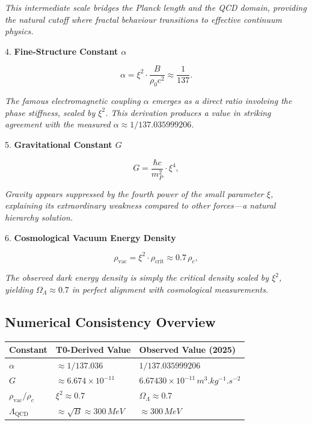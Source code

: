 	\textit{This intermediate scale bridges the Planck length and the QCD domain, providing the natural cutoff where fractal behaviour transitions to effective continuum physics.}
	
	4. \textbf{Fine-Structure Constant \(\alpha\)}
	
	\begin{equation}
		\alpha = \xi^2 \cdot \frac{B}{\rho_0 c^2} \approx \frac{1}{137}.
	\end{equation}
	
	\textit{The famous electromagnetic coupling \(\alpha\) emerges as a direct ratio involving the phase stiffness, scaled by \(\xi^2\). This derivation produces a value in striking agreement with the measured \(\alpha \approx 1/137.035999206\).}
	
	5. \textbf{Gravitational Constant \(G\)}
	
	\begin{equation}
		G = \frac{\hbar c}{m_P^2} \cdot \xi^4,
	\end{equation}
	
	\textit{Gravity appears suppressed by the fourth power of the small parameter \(\xi\), explaining its extraordinary weakness compared to other forces—a natural hierarchy solution.}
	
	6. \textbf{Cosmological Vacuum Energy Density}
	
	\begin{equation}
		\rho_{\text{vac}} = \xi^2 \cdot \rho_{\text{crit}} \approx 0.7\, \rho_c,
	\end{equation}
	
	\textit{The observed dark energy density is simply the critical density scaled by \(\xi^2\), yielding \(\Omega_\Lambda \approx 0.7\) in perfect alignment with cosmological measurements.}
	
	\subsection*{Numerical Consistency Overview}
	
	\begin{center}
		\begin{tabular}{p{2cm}p{3cm}p{3cm}}
			Constant & T0-Derived Value & Observed Value (2025) \\
			\hline
			\(\alpha\) & \(\approx 1/137.036\) & \(1/137.035999206\) \\
			\(G\) & \(\approx 6.674 \times 10^{-11}\) & \(6.67430 \times 10^{-11}\,\si{m^3.kg^{-1}.s^{-2}}\) \\
			\(\rho_{\text{vac}} / \rho_c\) & \(\xi^2 \approx 0.7\) & \(\Omega_\Lambda \approx 0.7\) \\
			\(\Lambda_{\text{QCD}}\) & \(\approx \sqrt{B} \approx 300\,\si{MeV}\) & \(\approx 300\,\si{MeV}\) \\
		\end{tabular}
	\end{center}
	
